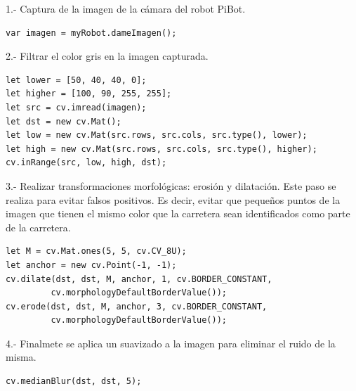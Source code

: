 \documentclass{report}
\begin{document}
1.- Captura de la imagen de la cámara del robot PiBot.

\begin{lstlisting}[backgroundcolor = \color{light-gray},
				   aboveskip = 2em,
				   belowskip = 2em,
                   xleftmargin = 2cm,
                   framexleftmargin = 1em,
                   basicstyle=\small]
var imagen = myRobot.dameImagen();
\end{lstlisting}

2.- Filtrar el color gris en la imagen capturada.

\begin{lstlisting}[backgroundcolor = \color{light-gray},
				   aboveskip = 2em,
				   belowskip = 2em,
                   xleftmargin = 2cm,
                   framexleftmargin = 1em,
                   basicstyle=\small]
let lower = [50, 40, 40, 0];
let higher = [100, 90, 255, 255];
let src = cv.imread(imagen);
let dst = new cv.Mat();
let low = new cv.Mat(src.rows, src.cols, src.type(), lower);
let high = new cv.Mat(src.rows, src.cols, src.type(), higher);
cv.inRange(src, low, high, dst);
\end{lstlisting}

3.- Realizar transformaciones morfológicas: erosión y dilatación. Este paso se realiza para evitar falsos positivos. Es decir, evitar que pequeños puntos de la imagen que tienen el mismo color que la carretera sean identificados como parte de la carretera.

\begin{lstlisting}[backgroundcolor = \color{light-gray},
				   aboveskip = 2em,
				   belowskip = 2em,
                   xleftmargin = 2cm,
                   framexleftmargin = 1em,
                   basicstyle=\small]
let M = cv.Mat.ones(5, 5, cv.CV_8U);
let anchor = new cv.Point(-1, -1);
cv.dilate(dst, dst, M, anchor, 1, cv.BORDER_CONSTANT,
		 cv.morphologyDefaultBorderValue());
cv.erode(dst, dst, M, anchor, 3, cv.BORDER_CONSTANT,
		 cv.morphologyDefaultBorderValue());
\end{lstlisting}

4.- Finalmete se aplica un suavizado a la imagen para eliminar el ruido de la misma.

\begin{lstlisting}[backgroundcolor = \color{light-gray},
				   aboveskip = 2em,
				   belowskip = 2em,
                   xleftmargin = 2cm,
                   framexleftmargin = 1em,
                   basicstyle=\small]
cv.medianBlur(dst, dst, 5);
\end{lstlisting}
\end{document}

